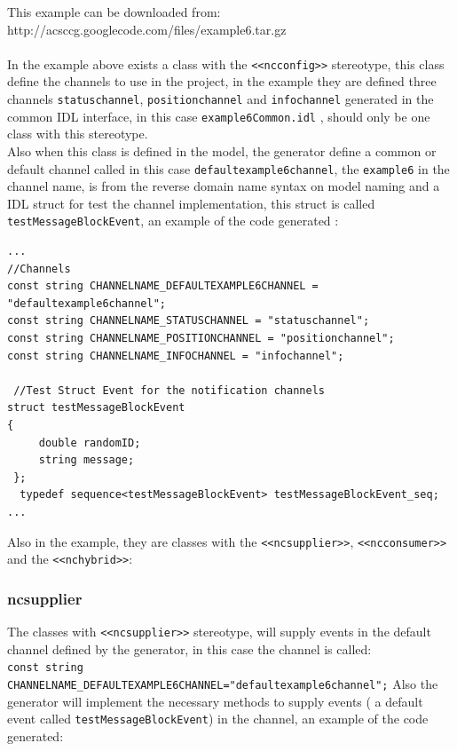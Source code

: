 This example can be downloaded from:
http://acsccg.googlecode.com/files/example6.tar.gz\\
\\
In the example above exists a class with the \verb+<<ncconfig>>+ stereotype,
this class define the channels to use in the project, in the example they are
defined three channels \verb+statuschannel+, \verb+positionchannel+ and
\verb+infochannel+ generated in the common IDL interface, in this case
\verb+example6Common.idl+ , should only be one class with this stereotype.
\\
Also when this class is defined in the model, the generator define a common or
default channel called in this case \verb+defaultexample6channel+, the
\verb+example6+ in the channel name, is from the reverse domain name syntax on
model naming and a IDL struct for test the channel implementation, this struct
is called \verb+testMessageBlockEvent+, an example of the code generated :

\begin{center}
\begin{verbatim}
...
//Channels
const string CHANNELNAME_DEFAULTEXAMPLE6CHANNEL = "defaultexample6channel";
const string CHANNELNAME_STATUSCHANNEL = "statuschannel";
const string CHANNELNAME_POSITIONCHANNEL = "positionchannel";
const string CHANNELNAME_INFOCHANNEL = "infochannel";

 //Test Struct Event for the notification channels
struct testMessageBlockEvent
{
     double randomID;  
     string message;
 };
  typedef sequence<testMessageBlockEvent> testMessageBlockEvent_seq;
...
\end{verbatim}
\end{center}

Also in the example, they are classes with the \verb+<<ncsupplier>>+,
\verb+<<ncconsumer>>+ and the \verb+<<nchybrid>>+:

\subsubsection{ncsupplier}
The classes with  \verb+<<ncsupplier>>+ stereotype, will supply events in the
default channel defined by the generator, in this case the channel is called:\\
\verb+const string CHANNELNAME_DEFAULTEXAMPLE6CHANNEL="defaultexample6channel";+
Also the generator will implement the necessary methods to supply events ( a
default event called \verb+testMessageBlockEvent+) in the channel, an
example of the code generated:

